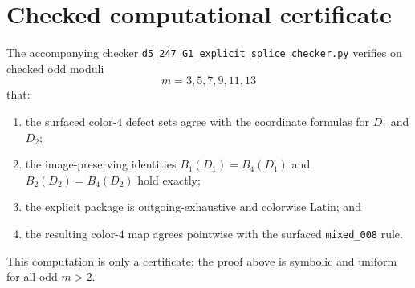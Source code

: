 \documentclass[11pt]{article}
\begin{document}
\section{Checked computational certificate}
The accompanying checker \texttt{d5\_247\_G1\_explicit\_splice\_checker.py}
verifies on checked odd moduli
\[
m=3,5,7,9,11,13
\]
that:
\begin{enumerate}[label=\textup{(\arabic*)},leftmargin=2.8em]
\item the surfaced color-\(4\) defect sets agree with the coordinate formulas
      for \(D_1\) and \(D_2\);
\item the image-preserving identities
      \(B_1(D_1)=B_4(D_1)\) and \(B_2(D_2)=B_4(D_2)\) hold exactly;
\item the explicit package is outgoing-exhaustive and colorwise Latin; and
\item the resulting color-\(4\) map agrees pointwise with the surfaced
      \texttt{mixed\_008} rule.
\end{enumerate}
This computation is only a certificate; the proof above is symbolic and uniform
for all odd \(m>2\).
\end{document}

